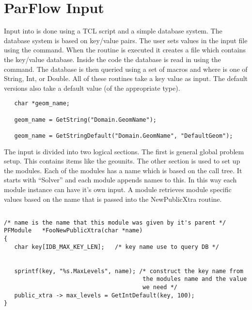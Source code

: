 
\chapter{ParFlow Input}
\label{ParFlow Input}

Input into \parflow{} is done using a TCL script and a simple 
database system.  The database system is based on key/value pairs.
The user sets values in the input file using
the  command.  When the  routine is executed
it creates a  file which contains the key/value
database.  Inside the \parflow{} code the database is read in using the
 command.  The database is then queried using a set
of macros  and  where 
is one of String, Int, or Double.  All of these routines take a key
value as input.  The default versions also take a default value (of
the appropriate type).

\begin{display}\begin{verbatim}
   char *geom_name;

   geom_name = GetString("Domain.GeomName");

   geom_name = GetStringDefault("Domain.GeomName", "DefaultGeom");

\end{verbatim}\end{display}

The input is divided into two logical sections.  The first is general
global problem setup.  This contains items like the geounits.  The
other section is used to set up the \parflow{} modules.  Each of the
modules has a name which is based on the call tree.  It starts with
``Solver'' and each module appends names to this.  In this way each module
instance can have it's own input.  A module retrieves module specific
values based on the name that is passed into the NewPublicXtra routine.

\begin{display}\begin{verbatim}

/* name is the name that this module was given by it's parent */
PFModule   *FooNewPublicXtra(char *name)
{
   char key[IDB_MAX_KEY_LEN];   /* key name use to query DB */
        

   sprintf(key, "%s.MaxLevels", name); /* construct the key name from
                                        the modules name and the value
                                        we need */
   public_xtra -> max_levels = GetIntDefault(key, 100);
}
\end{verbatim}\end{display}


